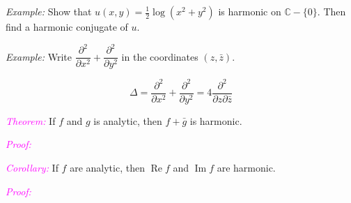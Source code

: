 \documentclass[xcolor={dvipsnames}]{beamer}
\newcommand{\CC}{\mathbb{C}}
\renewcommand{\th}[1]{\textcolor{Fuchsia}{\emph{#1}}}
\renewcommand{\Re}{\operatorname{Re}}
\renewcommand{\Im}{\operatorname{Im}}
\begin{document}
\begin{frame}
\end{frame}

\begin{frame}[t]
    \emph{Example:} Show that $u(x,y)=\frac12\log(x^2+y^2)$ is harmonic on $\CC-\{0\}$. Then find a harmonic conjugate of $u$.
\end{frame}

\begin{frame}
\end{frame}

\begin{frame}[t]
\emph{Example:} Write $\dfrac{\partial^2}{\partial x^2} + \dfrac{\partial^2}{\partial y^2}$ in the coordinates $(z, \bar z)$.
\end{frame}

\begin{frame}[t]
\[
    \Delta = \dfrac{\partial^2}{\partial x^2} + \dfrac{\partial^2}{\partial y^2}
    = 4\dfrac{\partial^2}{\partial z\partial\bar z}
\]

\bigskip
\th{Theorem:} If $f$ and $g$ is analytic, then $f + \bar g$ is harmonic.

\bigskip
\th{Proof:}
\end{frame}

\begin{frame}[t]
\th{Corollary:} If $f$ are analytic, then $\Re f$ and $\Im f$ are harmonic.

\bigskip
\th{Proof:}
\end{frame}
\end{document}
